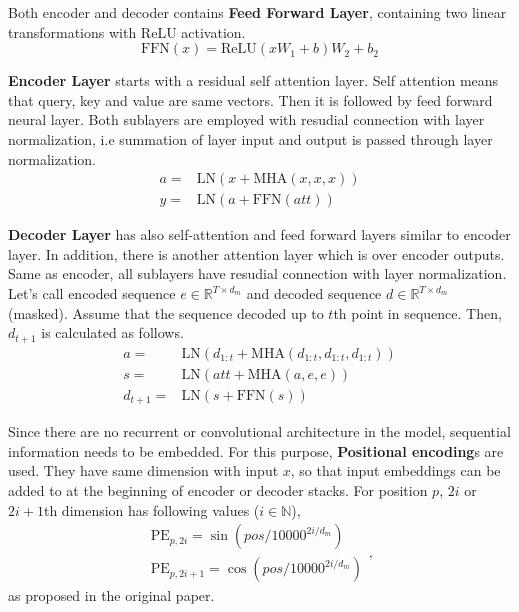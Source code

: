 Both encoder and decoder contains \textbf{Feed Forward Layer}, containing two linear transformations with ReLU activation.
\begin{equation}
\mathrm{FFN}(x) = \text{ReLU}(xW_1+b)W_2+b_2
\end{equation}

\textbf{Encoder Layer} starts with a residual self attention layer. 
Self attention means that query, key and value are same vectors. 
Then it is followed by feed forward neural layer. 
Both sublayers are employed with resudial connection with layer normalization, 
i.e summation of layer input and output is passed through layer normalization. 
\begin{equation}
\begin{split}
a = & \mathrm{LN}(x + \mathrm{MHA}(x,x,x)) \\
y = & \mathrm{LN}(a + \mathrm{FFN}(att))
\end{split}
\end{equation}

\textbf{Decoder Layer} has also self-attention and feed forward layers similar to encoder layer. 
In addition, there is another attention layer which is over encoder outputs. 
Same as encoder, all sublayers have resudial connection with layer normalization. 
Let's call encoded sequence $e \in \mathbb{R}^{T \times d_m}$ and decoded sequence $d \in \mathbb{R}^{T \times d_m}$ (masked). 
Assume that the sequence decoded up to $t$th point in sequence. 
Then, $d_{t+1}$ is calculated as follows. 
\begin{equation}
\begin{split}
a = & \mathrm{LN}(d_{1:t}+\mathrm{MHA}(d_{1:t},d_{1:t},d_{1:t})) \\
s = & \mathrm{LN}(att+ \mathrm{MHA}(a,e,e)) \\
d_{t+1} = & \mathrm{LN}(s+ \mathrm{FFN}(s))
\end{split}
\end{equation}

Since there are no recurrent or convolutional architecture in the model, sequential information needs to be embedded. 
For this purpose, \textbf{Positional encoding}s are used. 
They have same dimension with input $x$, so that input embeddings can be added to at the beginning of encoder or decoder stacks. 
For position $p$, $2i$ or $2i+1$th dimension has following values ($i \in \mathbb{N}$), 
\begin{equation}
\begin{split}
\mathrm{PE}_{p,2i} = \sin(pos/10000^{2i/d_m}) \\
\mathrm{PE}_{p,2i+1} = \cos(pos/10000^{2i/d_m})
\end{split},
\end{equation}
as proposed in the original paper. 

